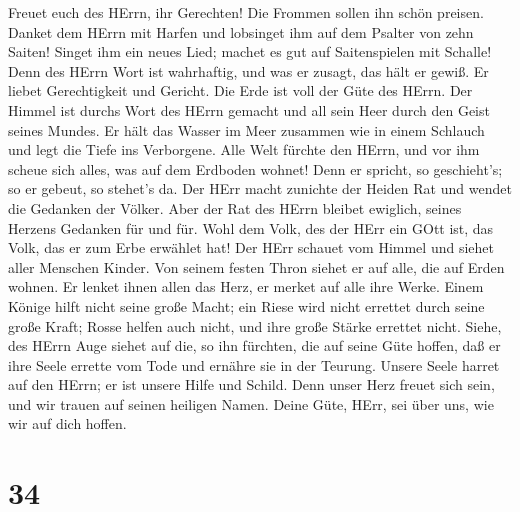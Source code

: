  Freuet euch des HErrn, ihr Gerechten! Die Frommen sollen
ihn schön preisen.  Danket dem HErrn mit Harfen und
lobsinget ihm auf dem Psalter von zehn Saiten!  Singet ihm
ein neues Lied; machet es gut auf Saitenspielen mit Schalle!
 Denn des HErrn Wort ist wahrhaftig, und was er zusagt, das
hält er gewiß.  Er liebet Gerechtigkeit und Gericht. Die
Erde ist voll der Güte des HErrn.  Der Himmel ist durchs
Wort des HErrn gemacht und all sein Heer durch den Geist seines Mundes.
 Er hält das Wasser im Meer zusammen wie in einem Schlauch
und legt die Tiefe ins Verborgene.  Alle Welt fürchte den
HErrn, und vor ihm scheue sich alles, was auf dem Erdboden wohnet!
 Denn er spricht, so geschieht's; so er gebeut, so stehet's
da.  Der HErr macht zunichte der Heiden Rat und wendet die
Gedanken der Völker.  Aber der Rat des HErrn bleibet
ewiglich, seines Herzens Gedanken für und für.  Wohl dem
Volk, des der HErr ein GOtt ist, das Volk, das er zum Erbe erwählet hat!
 Der HErr schauet vom Himmel und siehet aller Menschen
Kinder.  Von seinem festen Thron siehet er auf alle, die
auf Erden wohnen.  Er lenket ihnen allen das Herz, er
merket auf alle ihre Werke.  Einem Könige hilft nicht seine
große Macht; ein Riese wird nicht errettet durch seine große Kraft;
 Rosse helfen auch nicht, und ihre große Stärke errettet
nicht.  Siehe, des HErrn Auge siehet auf die, so ihn
fürchten, die auf seine Güte hoffen,  daß er ihre Seele
errette vom Tode und ernähre sie in der Teurung.  Unsere
Seele harret auf den HErrn; er ist unsere Hilfe und Schild.
 Denn unser Herz freuet sich sein, und wir trauen auf
seinen heiligen Namen.  Deine Güte, HErr, sei über uns, wie
wir auf dich hoffen.

\hypertarget{section-33}{%
\section{34}\label{section-33}}

